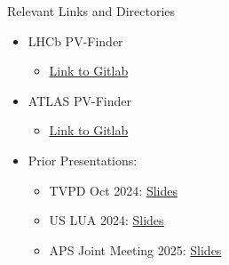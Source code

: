 \documentclass[xcolor=table,aspectratio=169]{beamer}
\begin{document}
\begin{frame}{Relevant Links and Directories}
    \begin{itemize}
        \item LHCb PV-Finder
        \begin{itemize}
            \item \href{https://gitlab.cern.ch/sakar/pv-finder_v2/-/tree/master}{Link to Gitlab}
        \end{itemize}
        \item ATLAS PV-Finder
        \begin{itemize}
            \item \href{https://gitlab.cern.ch/qlei/atlas_pvfinder}{Link to Gitlab}
        \end{itemize}
        \item Prior Presentations:
        \begin{itemize}
            \item TVPD Oct 2024: \href{https://drive.google.com/file/d/17qCnL57fT7LCKyQ1Rz-soJySaNCVeMRV/view?usp=sharing}{Slides}
            \item US LUA 2024: \href{https://drive.google.com/file/d/1HbAjlKBw6nej-oqOksUL_HOfKY8xsd2r/view?usp=sharing}{Slides}
            \item APS Joint Meeting 2025: \href{https://drive.google.com/file/d/1j6pnqzuXcP0OWXoUXkwElH8lAbv9GtRq/view?usp=drive_link}{Slides}
        \end{itemize}
    \end{itemize}
\end{frame}
\end{document}
